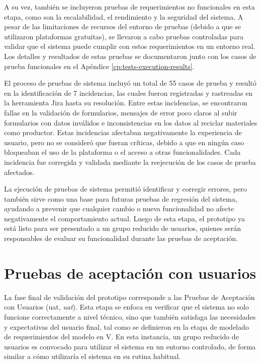 A su vez, también se incluyeron pruebas de requerimientos no funcionales en esta etapa, como son la escalabilidad, el rendimiento y la seguridad del sistema. A pesar de las limitaciones de recursos del entorno de pruebas (debido a que se utilizaron plataformas gratuitas), se llevaron a cabo pruebas controladas para validar que el sistema puede cumplir con estos requerimientos en un entorno real. Los detalles y resultados de estas pruebas se documentaron junto con los casos de prueba funcionales en el Apéndice \ref{cp:tests-execution-results}.

El proceso de pruebas de sistema incluyó un total de 55 casos de prueba y resultó en la identificación de 7 incidencias, las cuales fueron registradas y rastreadas en la herramienta Jira hasta su resolución. Entre estas incidencias, se encontraron fallas en la validación de formularios, mensajes de error poco claros al subir formularios con datos inválidos e inconsistencias en los datos al reciclar materiales como productor. Estas incidencias afectaban negativamente la experiencia de usuario, pero no se consideró que fueran críticas, debido a que en ningún caso bloqueaban el uso de la plataforma o el acceso a otras funcionalidades. Cada incidencia fue corregida y validada mediante la reejecución de los casos de prueba afectados.

La ejecución de pruebas de sistema permitió identificar y corregir errores, pero también sirve como una base para futuras pruebas de regresión del sistema, ayudando a prevenir que cualquier cambio o nueva funcionalidad no afecte negativamente el comportamiento actual. Luego de esta etapa, el prototipo ya está listo para ser presentado a un grupo reducido de usuarios, quienes serán responsables de evaluar su funcionalidad durante las pruebas de aceptación.

\section{Pruebas de aceptación con usuarios}
\label{sec:user-acceptance-testing}

La fase final de validación del prototipo corresponde a las Pruebas de Aceptación con Usuarios (\acrshort{uat}, \textit{\acrlong{uat}}). Esta etapa se enfoca en verificar que el sistema no solo funcione correctamente a nivel técnico, sino que también satisfaga las necesidades y expectativas del usuario final, tal como se definieron en la etapa de modelado de requerimientos del modelo en V. En esta instancia, un grupo reducido de usuarios es convocado para utilizar el sistema en un entorno controlado, de forma similar a cómo utilizaría el sistema en su rutina habitual. 

